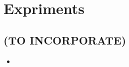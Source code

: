 \chapter{Expriments}\label{experiments}








\begin{unsortedStuff}	
\section*{(TO INCORPORATE)}
	\begin{itemize}
		\item 
	\end{itemize}
\end{unsortedStuff}
		
\begin{optBlankSpace}
	\newpage
	\mbox{}
\end{optBlankSpace}


